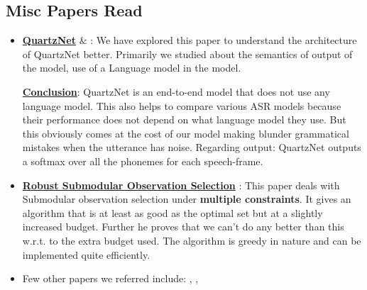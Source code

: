 \documentclass[12pt, a4paper, twoside]{article}
\begin{document}
\subsection{Misc Papers Read}
\begin{itemize}
    \item \underline{\textbf{QuartzNet}} \cite{kriman2020quartznet} $\&$ \cite{li2019jasper}: We have explored this paper to understand the architecture of QuartzNet better. Primarily we studied about the semantics of output of the model, use of a Language model in the model.
    
    \underline{\textbf{Conclusion}}: QuartzNet is an end-to-end model that does not use any language model. This also helps to compare various ASR models because their performance does not depend on what language model they use. But this obviously comes at the cost of our model making blunder grammatical mistakes when the utterance has noise. Regarding output: QuartzNet outputs a softmax over all the phonemes for each speech-frame.
    
    \item \underline{\textbf{Robust Submodular Observation Selection}} \cite{krause2008robust}: This paper deals with Submodular observation selection under \textbf{multiple constraints}. It gives an algorithm that is at least as good as the optimal set but at a slightly increased budget. Further he proves that we can't do any better than this w.r.t. to the extra budget used. The algorithm is greedy in nature and can be implemented quite efficiently.
    \item Few other papers we referred include: \cite{asami2015training}, \cite{sethy2009iterative}, \cite{woodward2020confidence}
    
    
\end{itemize}




\newpage





\end{document}
